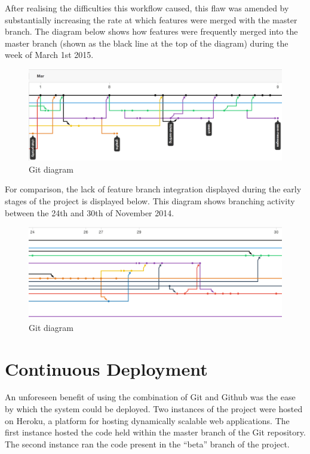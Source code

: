 \documentclass[a4paper]{l3proj}
\begin{document}
After realising the difficulties this workflow caused, this flaw was amended by substantially increasing the rate at which features were merged with the master branch. The diagram below shows how features were frequently merged into the master branch (shown as the black line at the top of the diagram) during the week of March 1st 2015. \\

\begin{figure}
\includegraphics[scale=0.5]{diagram}
\caption{Git diagram}
\end{figure} 
 
 For comparison, the lack of feature branch integration displayed during the early stages of the project is displayed below. This diagram shows branching activity between the 24th and 30th of November 2014. 

\begin{figure}
\includegraphics[scale=0.5]{diagram2}
\caption{Git diagram}
\end{figure} 

\section{Continuous Deployment}
\label{deployment}

An unforeseen benefit of using the combination of Git and Github was the ease by which the system could be deployed. Two instances of the project were hosted on Heroku, a platform for hosting dynamically scalable web applications. The first instance hosted the code held within the master branch of the Git repository. The second instance ran the code present in the “beta” branch of the project.
\end{document}
